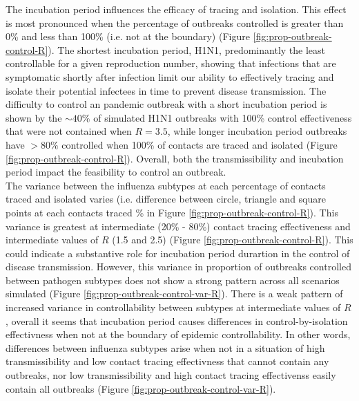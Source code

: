 \documentclass{article}
\begin{document}
The incubation period influences the efficacy of tracing and isolation. This effect is most pronounced when the percentage of outbreaks controlled is greater than 0\% and less than 100\% (i.e. not at the boundary) (Figure \ref{fig:prop-outbreak-control-R}). The shortest incubation period, H1N1, predominantly the least controllable for a given reproduction number, showing that infections that are symptomatic shortly after infection limit our ability to effectively tracing and isolate their potential infectees in time to prevent disease transmission. The difficulty to control an pandemic outbreak with a short incubation period is shown by the $\sim 40\%$ of simulated H1N1 outbreaks with 100\% control effectiveness that were not contained when $R = 3.5$, while longer incubation period outbreaks have $>80\%$ controlled when 100\% of contacts are traced and isolated (Figure \ref{fig:prop-outbreak-control-R}). Overall, both the transmissibility and incubation period impact the feasibility to control an outbreak. \\

The variance between the influenza subtypes at each percentage of contacts traced and isolated varies (i.e. difference between circle, triangle and square points at each contacts traced \% in Figure \ref{fig:prop-outbreak-control-R}). This variance is greatest at intermediate (20\% - 80\%) contact tracing effectiveness and intermediate values of $R$ (1.5 and 2.5) (Figure \ref{fig:prop-outbreak-control-R}). This could indicate a substantive role for incubation period durartion in the control of disease transmission. However, this variance in proportion of outbreaks controlled between pathogen subtypes does not show a strong pattern across all scenarios simulated (Figure \ref{fig:prop-outbreak-control-var-R}). There is a weak pattern of increased variance in controllability between subtypes at intermediate values of $R$, overall it seems that incubation period causes differences in control-by-isolation effectivness when not at the boundary of epidemic controllability. In other words, differences between influenza subtypes arise when not in a situation of high transmissibility and low contact tracing effectivness that cannot contain any outbreaks, nor low transmissibility and high contact tracing effectivenss easily contain all outbreaks (Figure \ref{fig:prop-outbreak-control-var-R}). \\
\end{document}

